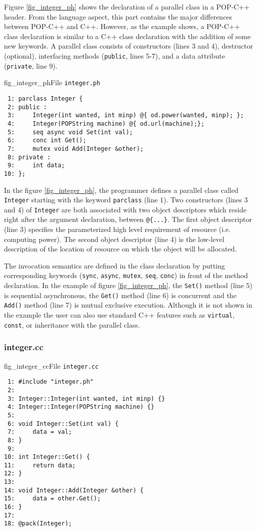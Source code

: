 Figure \ref{fig_integer_ph} shows the declaration of a parallel class in a
POP-C++ header. From the language aspect, this part contains the major
differences between POP-C++ and C++. However, as the example shows,
a POP-C++ class declaration is similar to a C++ class declaration with the addition of some new keywords. A parallel class consists of
constructors (lines 3 and 4), destructor (optional), interfacing methods
(\texttt{public}, lines 5-7), and a data attribute (\texttt{private},
line 9).

\begin{figura}{fig_integer_ph}{File \texttt{integer.ph}}%
\vspace{-4mm}%
\begin{verbatim}
 1: parclass Integer {
 2: public :
 3:     Integer(int wanted, int minp) @{ od.power(wanted, minp); };
 4:     Integer(POPString machine) @{ od.url(machine);};
 5:     seq async void Set(int val);
 6:     conc int Get();
 7:     mutex void Add(Integer &other);
 8: private :
 9:     int data;
10: };
\end{verbatim}
\end{figura}

In the figure \ref{fig_integer_ph}, the programmer defines a parallel
class called \texttt{Integer} starting with the keyword
\texttt{parclass} (line 1). Two constructors (lines 3 and 4) of
\texttt{Integer} are both associated with two object descriptors which
reside right after the argument declaration, between \texttt{@\{...\}}.
The first object descriptor (line 3) specifies the parameterized high
level requirement of resource (i.e. computing power). The second object
descriptor (line 4) is the low-level description of the location of
resource on which the object will be allocated.


The invocation semantics are defined in the class declaration by putting
corresponding keywords (\texttt{sync}, \texttt{async}, \texttt{mutex},
\texttt{seq}, \texttt{conc}) in front of the method declaration. In the
example of figure \ref{fig_integer_ph}, the \texttt{Set()} method (line
5) is sequential asynchronous, the \texttt{Get()} method (line 6) is
concurrent and the \texttt{Add()} method (line 7) is mutual exclusive
execution. Although it is not shown in the example the user can also
use standard C++ features such as \texttt{virtual}, \texttt{const}, or
inheritance with the parallel class.


\subsubsection{integer.cc}
\begin{figura}{fig_integer_cc}{File \texttt{integer.cc}}%
\vspace{-4mm}%
\begin{verbatim}
 1: #include "integer.ph"
 2: 
 3: Integer::Integer(int wanted, int minp) {}
 4: Integer::Integer(POPString machine) {}
 5: 
 6: void Integer::Set(int val) {
 7:     data = val;
 8: }
 9: 
10: int Integer::Get() {
11:     return data;
12: }
13: 
14: void Integer::Add(Integer &other) {
15:     data = other.Get();
16: }
17: 
18: @pack(Integer);
\end{verbatim}
\end{figura}

